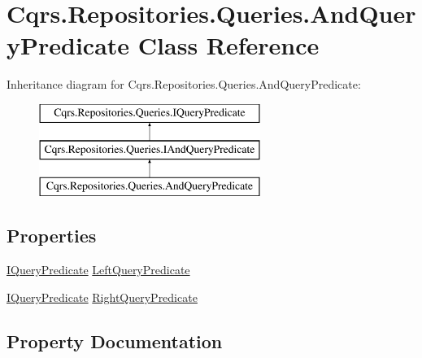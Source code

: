 \hypertarget{classCqrs_1_1Repositories_1_1Queries_1_1AndQueryPredicate}{}\section{Cqrs.\+Repositories.\+Queries.\+And\+Query\+Predicate Class Reference}
\label{classCqrs_1_1Repositories_1_1Queries_1_1AndQueryPredicate}
Inheritance diagram for Cqrs.\+Repositories.\+Queries.\+And\+Query\+Predicate\+:\begin{figure}[H]
\begin{center}
\leavevmode
\includegraphics[height=3.000000cm]{classCqrs_1_1Repositories_1_1Queries_1_1AndQueryPredicate}
\end{center}
\end{figure}
\subsection*{Properties}
\begin{DoxyCompactItemize}
\item 
\hyperlink{interfaceCqrs_1_1Repositories_1_1Queries_1_1IQueryPredicate}{I\+Query\+Predicate} \hyperlink{classCqrs_1_1Repositories_1_1Queries_1_1AndQueryPredicate_ae083f7e251a564554bdb00b111226f18}{Left\+Query\+Predicate}
\item 
\hyperlink{interfaceCqrs_1_1Repositories_1_1Queries_1_1IQueryPredicate}{I\+Query\+Predicate} \hyperlink{classCqrs_1_1Repositories_1_1Queries_1_1AndQueryPredicate_aa55816927e363ba4e7e313ad30ac2c2e}{Right\+Query\+Predicate}
\end{DoxyCompactItemize}


\subsection{Property Documentation}
\mbox{\label{classCqrs_1_1Repositories_1_1Queries_1_1AndQueryPredicate_ae083f7e251a564554bdb00b111226f18}} 
